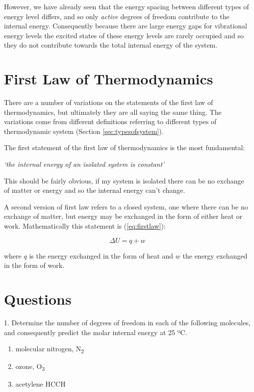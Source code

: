 \documentclass[
]{book}
\providecommand{\tightlist}{%
  \setlength{\itemsep}{0pt}\setlength{\parskip}{0pt}}
\begin{document}
However, we have already seen that the energy spacing between different types of energy level differs, and so only \emph{active} degrees of freedom contribute to the internal energy. Consequently because there are large energy gaps for vibrational energy levels the excited states of these energy levels are rarely occupied and so they do not contribute towards the total internal energy of the system.

\hypertarget{first-law-of-thermodynamics}{%
\section{First Law of Thermodynamics}\label{first-law-of-thermodynamics}}

There are a number of variations on the statements of the first law of thermodynamics, but ultimately they are all saying the same thing. The variations come from different definitions referring to different types of thermodynamic system (Section \ref{sec:typesofsystem}).

The first statement of the first law of thermodynamics is the most fundamental:

\emph{`the internal energy of an isolated system is constant'}

This should be fairly obvious, if my system is isolated there can be no exchange of matter or energy and so the internal energy can't change.

A second version of first law refers to a closed system, one where there can be no exchange of matter, but energy may be exchanged in the form of either heat or work. Mathematically this statement is (\eqref{eq:firstlaw}):

\begin{equation}
\Delta U = q + w
\label{eq:firstlaw}
\end{equation}

where \(q\) is the energy exchanged in the form of heat and \(w\) the energy exchanged in the form of work.

\hypertarget{questions}{%
\section{Questions}\label{questions}}

1. Determine the number of degrees of freedom in each of the following molecules, and consequently predict the molar internal energy at 25 ºC.

\begin{enumerate}
\def\labelenumi{\alph{enumi}.}
\tightlist
\item
  molecular nitrogen, N\textsubscript{2}
\item
  ozone, O\textsubscript{3}
\item
  acetylene HCCH
\end{enumerate}
\end{document}
